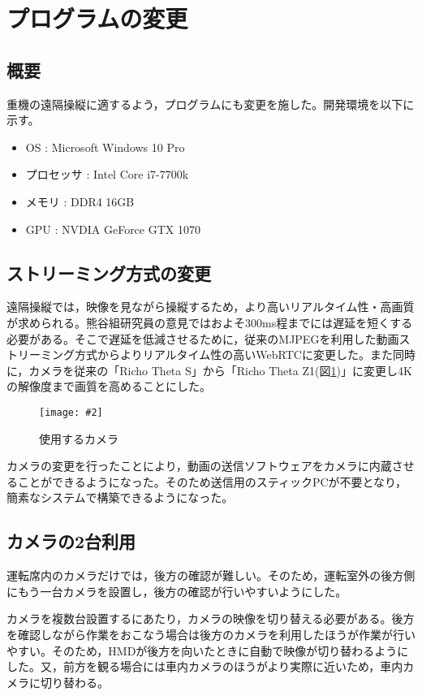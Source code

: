\documentclass[a4paper,12pt]{jsarticle}
\newcommand{\figuref}[1]{図\ref{#1}}
\newcommand{\fig}[4][width=\textwidth]{
    \begin{figure}[!h]
    \begin{center}
    \texttt{[image: \#2]}
    \caption{#3}
    \label{#4}
    \vspace*{-1cm}
    \end{center}
    \end{figure}
}
\begin{document}
\clearpage

\section{プログラムの変更}
\subsection{概要}
重機の遠隔操縦に適するよう，プログラムにも変更を施した。開発環境を以下に示す。
\begin{itemize}
    \item OS : Microsoft Windows 10 Pro
    \item プロセッサ : Intel Core i7-7700k
    \item メモリ : DDR4 16GB
    \item GPU : NVDIA GeForce GTX 1070
\end{itemize}

\subsection{ストリーミング方式の変更}
遠隔操縦では，映像を見ながら操縦するため，より高いリアルタイム性・高画質が求められる。熊谷組研究員の意見ではおよそ300ms程までには遅延を短くする必要がある。そこで遅延を低減させるために，従来のMJPEGを利用した動画ストリーミング方式からよりリアルタイム性の高いWebRTCに変更した。また同時に，カメラを従来の「Richo Theta S」から「Richo Theta Z1(\figuref{theta})」に変更し4Kの解像度まで画質を高めることにした。

\fig[width=7cm]{image/theta.jpg}{使用するカメラ}{theta}

カメラの変更を行ったことにより，動画の送信ソフトウェアをカメラに内蔵させることができるようになった。そのため送信用のスティックPCが不要となり，簡素なシステムで構築できるようになった。

\subsection{カメラの2台利用}
運転席内のカメラだけでは，後方の確認が難しい。そのため，運転室外の後方側にもう一台カメラを設置し，後方の確認が行いやすいようにした。

カメラを複数台設置するにあたり，カメラの映像を切り替える必要がある。後方を確認しながら作業をおこなう場合は後方のカメラを利用したほうが作業が行いやすい。そのため，HMDが後方を向いたときに自動で映像が切り替わるようにした。又，前方を観る場合には車内カメラのほうがより実際に近いため，車内カメラに切り替わる。
\end{document}
